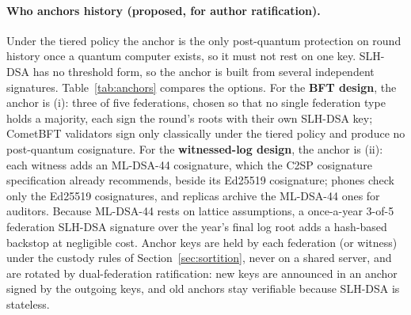 \documentclass[10pt,twoside,openany]{book}
\theoremstyle{dpepstyle}
\begin{document}
\paragraph{Who anchors history (proposed, for author ratification).} Under the tiered policy the anchor is the only post-quantum protection on round history once a quantum computer exists, so it must not rest on one key. SLH-DSA has no threshold form, so the anchor is built from several independent signatures. Table~\ref{tab:anchors} compares the options. For the \textbf{BFT design}, the anchor is (i): three of five federations, chosen so that no single federation type holds a majority, each sign the round's roots with their own SLH-DSA key; CometBFT validators sign only classically under the tiered policy and produce no post-quantum cosignature. For the \textbf{witnessed-log design}, the anchor is (ii): each witness adds an ML-DSA-44 cosignature, which the C2SP cosignature specification already recommends, beside its Ed25519 cosignature; phones check only the Ed25519 cosignatures, and replicas archive the ML-DSA-44 ones for auditors. Because ML-DSA-44 rests on lattice assumptions, a once-a-year 3-of-5 federation SLH-DSA signature over the year's final log root adds a hash-based backstop at negligible cost. Anchor keys are held by each federation (or witness) under the custody rules of Section~\ref{sec:sortition}, never on a shared server, and are rotated by dual-federation ratification: new keys are announced in an anchor signed by the outgoing keys, and old anchors stay verifiable because SLH-DSA is stateless.
\end{document}
